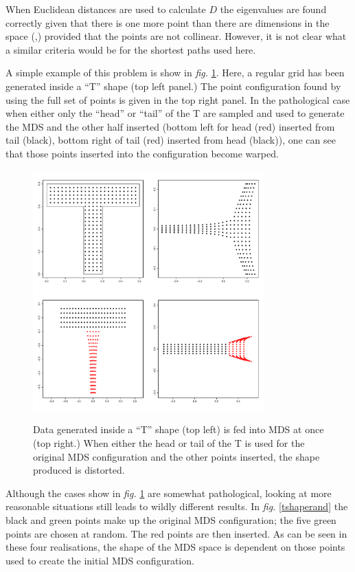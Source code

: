 \documentclass[a4paper,10pt]{article}
\newcommand{\fig}[1]{\emph{fig.} \ref{#1}}
\begin{document}
When Euclidean distances are used to calculate $D$ the eigenvalues are found correctly given that there is one more point than there are dimensions in the space (\cite{landmark},) provided that the points are not collinear. However, it is not clear what a similar criteria would be for the shortest paths used here. 

A simple example of this problem is show in \fig{tshape}. Here, a regular grid has been generated inside a ``T'' shape (top left panel.) The point configuration found by using the full set of points is given in the top right panel. In the pathological case when either only the ``head'' or ``tail'' of the T are sampled and used to generate the MDS and the other half inserted (bottom left for head (red) inserted from tail (black), bottom right of tail (red) inserted from head (black)), one can see that those points inserted into the configuration become warped. 

\begin{figure}
\centering
\includegraphics[width=3.5in]{figs/tshape.pdf} \\
\caption{Data generated inside a ``T'' shape (top left) is fed into MDS at once (top right.) When either the head or tail of the T is used for the original MDS configuration and the other points inserted, the shape produced is distorted.}
\label{tshape}
\end{figure}

Although the cases show in \fig{tshape} are somewhat pathological, looking at more reasonable situations still leads to wildly different results. In \fig{tshaperand} the black and green points make up the original MDS configuration; the five green points are chosen at random. The red points are then inserted. As can be seen in these four realisations, the shape of the MDS space is dependent on those points used to create the initial MDS configuration.
\end{document}
